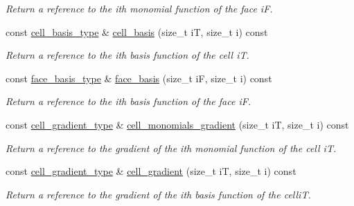 \begin{DoxyCompactItemize}
\begin{DoxyCompactList}\small\item\em Return a reference to the i\textquotesingle{}th monomial function of the face iF. \end{DoxyCompactList}\item 
const \hyperlink{classHArDCore3D_1_1HybridCore_a9e760b418a3948b34114879f37086829}{cell\+\_\+basis\+\_\+type} \& \hyperlink{classHArDCore3D_1_1HybridCore_a34242db07cc2b3c3b867d9e4580b634d}{cell\+\_\+basis} (size\+\_\+t iT, size\+\_\+t i) const
\begin{DoxyCompactList}\small\item\em Return a reference to the i\textquotesingle{}th basis function of the cell iT. \end{DoxyCompactList}\item 
const \hyperlink{classHArDCore3D_1_1HybridCore_ae0b0cdad94d3527d0b06e601c091cdad}{face\+\_\+basis\+\_\+type} \& \hyperlink{classHArDCore3D_1_1HybridCore_a7bacf0ebee651940baa7f04af5a47b65}{face\+\_\+basis} (size\+\_\+t iF, size\+\_\+t i) const
\begin{DoxyCompactList}\small\item\em Return a reference to the i\textquotesingle{}th basis function of the face iF. \end{DoxyCompactList}\item 
const \hyperlink{classHArDCore3D_1_1HybridCore_ad4dd9ca67d6de59d7ea71c816d3d3e67}{cell\+\_\+gradient\+\_\+type} \& \hyperlink{classHArDCore3D_1_1HybridCore_a0edb2fb02577f68744abb8a436381cf7}{cell\+\_\+monomials\+\_\+gradient} (size\+\_\+t iT, size\+\_\+t i) const
\begin{DoxyCompactList}\small\item\em Return a reference to the gradient of the i\textquotesingle{}th monomial function of the cell iT. \end{DoxyCompactList}\item 
const \hyperlink{classHArDCore3D_1_1HybridCore_ad4dd9ca67d6de59d7ea71c816d3d3e67}{cell\+\_\+gradient\+\_\+type} \& \hyperlink{classHArDCore3D_1_1HybridCore_a710fc23b914623b90a2699ab4291e539}{cell\+\_\+gradient} (size\+\_\+t iT, size\+\_\+t i) const
\begin{DoxyCompactList}\small\item\em Return a reference to the gradient of the i\textquotesingle{}th basis function of the celliT. \end{DoxyCompactList}\item 
\mbox{\label{classHArDCore3D_1_1HybridCore_a02b46a742045262030431b73eb112f9c}} 

\end{DoxyCompactItemize}
